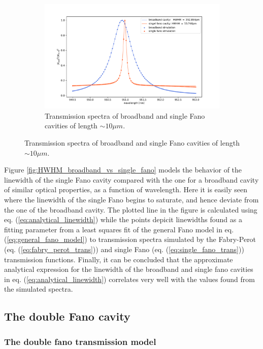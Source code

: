\begin{figure}[h!]
\begin{subfigure}[c]{0.34\textwidth}
        \includegraphics[width=\textwidth]{figures/sim_single_vs_broadband_10um.pdf}
        \caption{Transmission spectra of broadband and single Fano cavities of length $\sim 10 \mu m$.}
        \label{fig:10um_broadband_and_single_fano_peak}
    \end{subfigure}
\end{figure}

Figure \ref{fig:HWHM_broadband_vs_single_fano} models the behavior of the linewidth of the single Fano cavity compared with the one for a broadband cavity of similar optical properties, as a function of wavelength. Here it is easily seen where the linewidth of the single Fano begins to saturate, and hence deviate from the one of the broadband cavity. The plotted line in the figure is calculated using eq. (\ref{eq:analytical_linewidth}) while the points depicit linewidths found as a fitting parameter from a least squares fit of the general Fano model in eq. (\ref{eq:general_fano_model}) to transmission spectra simulated by the Fabry-Perot (eq. (\ref{eq:fabry_perot_trans})) and single Fano (eq. (\ref{eq:single_fano_trans})) transmission functions. Finally, it can be concluded that the approximate analytical expression for the linewidth of the broadband and single fano cavities in eq. (\ref{eq:analytical_linewidth}) correlates very well with the values found from the simulated spectra.

\subsection{The double Fano cavity}

\subsubsection{The double fano transmission model}

